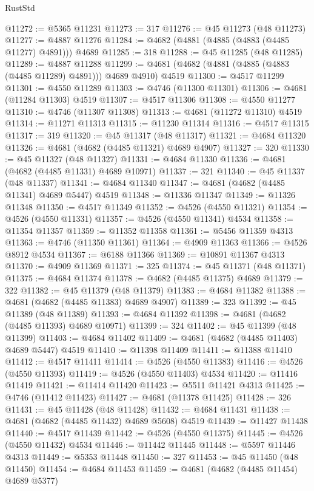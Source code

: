 \begin{lexlean}{RustStd}
\begin{coremodule}
@11272 := @5365 @11231
@11273 := 317
@11276 := @45 @11273 (@48 @11273)
@11277 := @4887 @11276
@11284 := @4682 (@4881 (@4885 (@4883 (@4485 @11277) @4891))) @4689
@11285 := 318
@11288 := @45 @11285 (@48 @11285)
@11289 := @4887 @11288
@11299 := @4681 (@4682 (@4881 (@4885 (@4883 (@4485 @11289) @4891))) @4689 @4910) @4519
@11300 := @4517 @11299
@11301 := @4550 @11289
@11303 := @4746 (@11300 @11301)
@11306 := @4681 (@11284 @11303) @4519
@11307 := @4517 @11306
@11308 := @4550 @11277
@11310 := @4746 (@11307 @11308)
@11313 := @4681 (@11272 @11310) @4519
@11314 := @11271 @11313
@11315 := @11230 @11314
@11316 := @4517 @11315
@11317 := 319
@11320 := @45 @11317 (@48 @11317)
@11321 := @4684 @11320
@11326 := @4681 (@4682 (@4485 @11321) @4689 @4907)
@11327 := 320
@11330 := @45 @11327 (@48 @11327)
@11331 := @4684 @11330
@11336 := @4681 (@4682 (@4485 @11331) @4689 @10971)
@11337 := 321
@11340 := @45 @11337 (@48 @11337)
@11341 := @4684 @11340
@11347 := @4681 (@4682 (@4485 @11341) @4689 @5447) @4519
@11348 := @11336 @11347
@11349 := @11326 @11348
@11350 := @4517 @11349
@11352 := @4526 (@4550 @11321)
@11354 := @4526 (@4550 @11331)
@11357 := @4526 (@4550 @11341) @4534
@11358 := @11354 @11357
@11359 := @11352 @11358
@11361 := @5456 @11359 @4313
@11363 := @4746 (@11350 @11361)
@11364 := @4909 @11363
@11366 := @4526 @8912 @4534
@11367 := @6188 @11366
@11369 := @10891 @11367 @4313
@11370 := @4909 @11369
@11371 := 325
@11374 := @45 @11371 (@48 @11371)
@11375 := @4684 @11374
@11378 := @4682 (@4485 @11375) @4689
@11379 := 322
@11382 := @45 @11379 (@48 @11379)
@11383 := @4684 @11382
@11388 := @4681 (@4682 (@4485 @11383) @4689 @4907)
@11389 := 323
@11392 := @45 @11389 (@48 @11389)
@11393 := @4684 @11392
@11398 := @4681 (@4682 (@4485 @11393) @4689 @10971)
@11399 := 324
@11402 := @45 @11399 (@48 @11399)
@11403 := @4684 @11402
@11409 := @4681 (@4682 (@4485 @11403) @4689 @5447) @4519
@11410 := @11398 @11409
@11411 := @11388 @11410
@11412 := @4517 @11411
@11414 := @4526 (@4550 @11383)
@11416 := @4526 (@4550 @11393)
@11419 := @4526 (@4550 @11403) @4534
@11420 := @11416 @11419
@11421 := @11414 @11420
@11423 := @5511 @11421 @4313
@11425 := @4746 (@11412 @11423)
@11427 := @4681 (@11378 @11425)
@11428 := 326
@11431 := @45 @11428 (@48 @11428)
@11432 := @4684 @11431
@11438 := @4681 (@4682 (@4485 @11432) @4689 @5608) @4519
@11439 := @11427 @11438
@11440 := @4517 @11439
@11442 := @4526 (@4550 @11375)
@11445 := @4526 (@4550 @11432) @4534
@11446 := @11442 @11445
@11448 := @5597 @11446 @4313
@11449 := @5353 @11448
@11450 := 327
@11453 := @45 @11450 (@48 @11450)
@11454 := @4684 @11453
@11459 := @4681 (@4682 (@4485 @11454) @4689 @5377)

\end{coremodule}
\end{lexlean}
